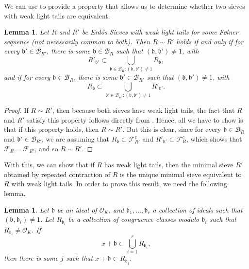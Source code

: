 \documentclass[a4paper,11pt,reqno]{amsart}
\theoremstyle{plain}
\newtheorem{lemma}[theorem]{Lemma}
\theoremstyle{remark}
\newcommand{\cb}{\mathcal{B}}
\newcommand{\co}{\mathcal{O}}
\newcommand{\fr}{\mathcal{F}_R}
\newcommand{\frp}{\mathcal{F}_{R'}}
\newcommand{\gb}{\mathfrak{b}}
\begin{document}
		We can use   to provide a property that allows us to determine whether two sieves with weak light tails are equivalent.
		
		\begin{lemma}
			\label{lm:Characterization of equivalent sieves}
			Let $R$ and $R'$ be Erdős Sieves with weak light tails for some Følner sequence (not necessarily common to both). Then $R \sim R'$ holds if and only if for every $\gb' \in \cb_{R'}$, there is some $\gb \in \cb_{R}$ such that $(\gb,\gb') \neq 1 $, with $$R'_{\gb'} \subset \bigcup_{\gb \in \cb_{R}:(\gb,\gb') \neq 1} R_{\gb},$$ and if for every $\gb \in \cb_{R}$, there is some $\gb' \in \cb_{R'}$ such that $(\gb,\gb') \neq 1 $, with $$R_{\gb} \subset \bigcup_{\gb' \in \cb_{R'}:(\gb,\gb') \neq 1} R'_{\gb'}.$$
		\end{lemma}
		
		\begin{proof}
			If $R \sim R'$, then because both sieves have weak light tails, the fact that $R$ and $R'$ satisfy this property follows directly from  . Hence, all we have to show is that if this property holds, then $R \sim R'$. But this is clear, since for every $\gb \in\cb_R$ and $\gb' \in\cb_{R'}$, we are assuming that $R_\gb \subset \frp^c$ and $R'_{\gb'} \subset \fr^c$, which shows that $\fr = \frp$, and so $R \sim R'$. 
		\end{proof}
		
		With this, we can show that if $R$ has weak light tails, then the minimal sieve $R'$ obtained by repeated contraction of $R$ is the unique minimal sieve equivalent to $R$ with weak light tails. In order to prove this result, we need the following lemma.
		
		\begin{lemma}
			\label{lm: if x gb in union must belong to one}
			Let $\gb$ be an ideal of $\co_K$, and $\gb_1,\dots,\gb_r$ a collection of ideals such that $(\gb,\gb_i) \neq 1$. Let $R_{\gb_i}$ be a collection of congruence classes modulo $\gb_i$ such that $R_{\gb_i} \neq \co_K$. If $$x+\gb \subset \bigcup_{i=1}^r R_{\gb_i},$$ then there is some $j$ such that $x+\gb \subset R_{\gb_j}$.
		\end{lemma}
		
\end{document}
